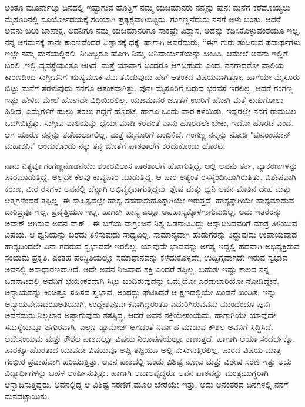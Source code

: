 {ಅಂತೂ ಮೂರ್ನಾಲ್ಕು ದಿನದಲ್ಲಿ ಇಷ್ಟಾಗುವ ಹೊತ್ತಿಗೆ ನಮ್ಮ ಯಜಮಾನರು ನನ್ನನ್ನು ಪುನಃ ಮನೆಗೆ ಕರೆದೊಯ್ಯಲು ಮೈಸೂರಿನಲ್ಲಿ ಸೂರ್ಯೋದಯಕ್ಕೆ ಸರಿಯಾಗಿ  ಪ್ರತ್ಯಕ್ಷವಾಗಿಬಿಟ್ಟರು. ಗಂಗಣ್ಣನೆದುರು ನನಗೆ ಅಳು ಬಂತು. ಆದರೆ ಅವನು ಬಲು ಚಾಣಾಕ್ಷ. ಅವನಿಗೂ ನಮ್ಮ ಯಜಮಾನರಿಗೂ ಸಾಕಷ್ಟೇ ವಿಶ್ವಾಸ, ಅದನ್ನು ಕೆಡಿಸಿ\-ಕೊಳ್ಳುವಂತೆಯೂ ಇಲ್ಲ. ನನ್ನ ಆಗಮನಕ್ಕೆ ತಾನೇ ಕಾರಣವೆಂದರೆ ವಿಶ್ವಾಸಕ್ಕೆ ಧಕ್ಕೆ. ಹಾಗಾಗಿ ಅವರೆದುರು, “ಈಗ ಗುರು ತಂದಿರುವ ಪದಾರ್ಥಗಳು ಇಲ್ಲೇ ನಮ್ಮ ಮನೆಯಲ್ಲಿರಲಿ. ನೀವಿಬ್ಬರೂ ಹೋಗಿ ನಿಮ್ಮ ಅನಿವಾರ್ಯತೆಯನ್ನು ಚಿಂತಿಸಿ, ಆಮೇಲೆ ಅವನು ಇಲ್ಲಿಗೆ ಬರಲಿ. ಇಲ್ಲಿ ವ್ಯವಸ್ಥೆಯಂತೂ ಆಗಿದೆ. ಮತ್ತೆ ಯಾವಾಗ ಬಂದರೂ ಆಗಬಹುದು ಎಂದ. ನನಗಾದರೋ ವಾಲಿಯ ಕಾರಣದಿಂದ ಸುಗ್ರೀವನಿಗೆ ಋಷ್ಯಮೂಕ ಪರ್ವತ\break  ಬಿಡುವುದು ಹೇಗೆ ಆತಂಕದ ವಿಷಯವಾಗಿತ್ತೋ,  ಹಾಗೆಯೇ  ಮೈಸೂರು ಬಿಟ್ಟು ಮನೆಗೆ ತೆರಳುವುದು  ನನಗೂ ಆತಂಕವಾಗಿತ್ತು. ಪುನಃ ಮೈಸೂರಿಗೆ ಬರುವ ಭರವಸೆ ಇರಲಿಲ್ಲ. ಆದರೆ ಗಂಗಣ್ಣ ಇಷ್ಟು ಹೇಳಿದ ಮೇಲೆ ಹೋಗದೇ ವಿಧಿಯಿರಲಿಲ್ಲ. ಯಜಮಾನರ ಜೊತೆಗೆ ಊರಿಗೆ ಹೋಗಿ ಮತ್ತೆ ಕುಡುಗೋಲು ಹಿಡಿದೆ, ಎಮ್ಮೆಗಳಿಗೆ ಹುಲ್ಲು ತರಲು ಗದ್ದೆಗೆ ಹೊರಟೆ. ಹಾಗೂ ಒಂದು ವಾರ ಕಳೆಯಿತು. ಇಷ್ಟರಲ್ಲೇ ನನಗೆ ರಾಮಬಲ ಒದಗಿಬಿಟ್ಟಿತ್ತು. ಸುಗ್ರೀವ ವಾಲಿಯನ್ನು ಧೈರ್ಯಮಾಡಿ ಕರೆದಂತೆ ನಾನು ಹೊರಡಲೇ ಬೇಕು, ಇದೋ ಹೊರಟೆ ಎಂದೆ. ಆಗ ಯಾರೂ ನನ್ನನ್ನು ತಡೆಯಲಾಗಲಿಲ್ಲ. ಮತ್ತೆ ಮೈಸೂರಿಗೆ ಬಂದಿಳಿದೆ. ಗಂಗಣ್ಣ ನನ್ನನ್ನು ನೋಡಿ "ಪುನರಾಯಾನ್ ಮಹಾಕಪಿಃ" ಅಂದುಕೊಂಡು ನಕ್ಕು ತನ್ನ ಜೊತೆಗೆ ಪಾಠಶಾಲೆಗೆ ಕರೆದುಕೊಂಡು ಹೊರಟ. 

ನಾನು ನಿತ್ಯವೂ ಗಂಗಣ್ಣನೊಡನೆಯೇ ಶಂಕರವಿಲಾಸ ಪಾಠಶಾಲೆಗೆ ಹೋಗುತ್ತಿದ್ದೆ. ಅಲ್ಲಿ ಅವನು ತರ್ಕ, ವ್ಯಾಕರಣಗಳನ್ನು ಪಾಠಮಾಡುತ್ತಿದ್ದ. ಅಲ್ಲದೇ ಕೆಲವು \hbox{ಕಾವ್ಯಪಾಠ} ಮಾಡುತ್ತಿದ್ದ. ಆ ಪಾಠ ಅತ್ಯಂತ ರಸಸ್ಯಂದಿಯಾಗಿರುತ್ತಿತ್ತು. ವಿಶೇಷವಾಗಿ ಕರುಣ, ವೀರ ರಸಗಳು ಅವನಲ್ಲಿ ಚೆನ್ನಾಗಿ ಅಭಿವ್ಯಕ್ತವಾಗುತ್ತಿದ್ದವು. ಶ್ಲೇಷ ಮತ್ತು ಧ್ವನಿ ಅವನ ಮಾತಿನ ದೇಹ ಮತ್ತು ಆತ್ಮಗಳೆಂದರೆ ತಪ್ಪಿಲ್ಲ. ಈ ಸಾಹಿತ್ಯದಲ್ಲೇ ಹಾಸ್ಯ  ಸಹ\break ಹಾಸು\enginline{-}ಹೊಕ್ಕಾಗಿಯೇ ಇರುತ್ತದೆ.  ಹಾಸ್ಯಕ್ಕಾಗಿಯೇ ಹಾಸ್ಯಮಾಡುವ ದಾರಿದ್ರ್ಯವೂ ಇಲ್ಲ,  ಪ್ರವೃತ್ತಿಯೂ ಇಲ್ಲ. ಹಾಗಾಗಿ ಹಾಸ್ಯ ಎಲ್ಲೂ ಅಪಹಾಸ್ಯಕ್ಕೊಳಗಾಗುವುದಿಲ್ಲ. ಅದು ಇತರರನ್ನು ಅವಾಕ್ ಆಗಿಸುವ ಅವನ ವಾಕ್ .  ಈ ಬಗೆಯ ವಾಗ್ರಂಜನೆ  ನಿತ್ಯ ಒಡನಾಟವಿದ್ದು ಆಸ್ವಾದಿಸಿದವರಿಗೆ ಮಾತ್ರ  ತಿಳಿಯುವ ವಿಷಯ. ಆ ಧ್ವನಿಯನ್ನು  ಬರೆದು ತಿಳಿಸುವುದು  ಸಾಧ್ಯವಿಲ್ಲ. ಸಾಮಾನ್ಯವಾಗಿ ಹುಡುಗರನ್ನು ತಿದ್ದುವುದು ಉಪಾಯವಾದ ಹಾಸ್ಯದಿಂದಲೇ ವಿನಾ ಗದರುವ ಸ್ವಭಾವವೇ ಇರಲಿಲ್ಲ. ಯಾವುದೇ ಭಾವವನ್ನು ಅಗತ್ಯ ಇದ್ದಲ್ಲಿ ಹದವಾಗಿ ಅಭಿವ್ಯಕ್ತಿಸುವ ಸಂಯಮ ಪ್ರಕೃತಿ. ಎಂತಹ ಪರಿಸ್ಥಿತಿಯಲ್ಲೂ ಸಮಾಧಾನವನ್ನು ಕಳೆದು\-ಕೊಳ್ಳದೇ, ಉದ್ವಿಗ್ನವಾಗದೇ ಇರುವ ಸ್ವಭಾವ ಅವನಲ್ಲಿ ಅಸಾಧಾರಣ\-ವಾಗಿದೆ. ಅದೇ ಅವನ ನಿಜವಾದ ಶಕ್ತಿ ಎಂದರೆ ತಪ್ಪಿಲ್ಲ. ಬಹುಶಃ ಇಷ್ಟು ಕಾಲದ ನನ್ನ ಒಡನಾಟದಲ್ಲಿ ಅವನಿಗೆ ಭಯಂಕರವಾಗಿ ಸಿಟ್ಟು ಬಂದಿರುವುದನ್ನು   ಒಮ್ಮೆಯೋ ಎರಡು\break ಬಾರಿಯೋ ನೋಡಿದ್ದೇನೆ. ಅನ್ಯಾಯವನ್ನು ಕಿಂಚಿತ್ತೂ ಸಹಿಸದ ಸ್ವಭಾವ, ಅಂಥದ್ದು  ಘಟಿಸಿದರೆ  ಆ ಕ್ಷಣದಲ್ಲಿಯೇ ಖಂಡನೆ ಖಂಡಿತ. ಇನ್ನು  ಅನ್ಯಾಯವೇನಾದರೂ\break ಅತಿಯಾಗಿ, ಉದ್ದೇಶಪೂರ್ವಕವಾಗಿದ್ದರಂತೂ ಎದುರಿಗಿರುವವನು ಮುಂದೆಂದೂ ಪುನಃ ಅವನೆದುರು ನಿಲ್ಲಲಾರ \enginline{-} ಅಷ್ಟಾಗುವುದು ಶತಸ್ಸಿದ್ಧ. ಆದರೆ ಅವನ ಶಕ್ತಿಯೇ\break ಸಂಯಮ. ಹಾಗಾಗಿಯೇ ಯಾವುದೇ ಸಮಸ್ಯೆಯನ್ನೂ ಹಗುರವಾಗಿ, ಎಲ್ಲೂ \break ಡ್ಯಾಮೇಜ್ ಆಗದಂತೆ ನಿರ್ವಾಹ ಮಾಡುವ ಕೌಶಲ ಅವನಿಗೆ ಸಿದ್ಧಿಸಿದೆ. ಅದೇ\break ಸಂಯಮ ಮತ್ತು ಕೌಶಲ ಪಾಠದಲ್ಲೂ ವಿಷಯ ನಿರೂಪಣೆಯಲ್ಲೂ ಕಾಣುತ್ತದೆ. ಹಾಗಾಗಿ ಆಯಾ \hbox{ಸಂದರ್ಭಕ್ಕೂ}, ಪಾಠಕ್ಕೂ ಹೊರತಾದ ಯಾವದೇ ವಿಷಯವೂ ಅಪ್ಪಿ ತಪ್ಪಿಯೂ ಅಲ್ಲಿ ನುಸುಳುತ್ತಿರ\-ಲಿಲ್ಲ. ಪಾಠದ ವಿಷಯ ಮಾತ್ರ ಗಂಭೀರ ಪ್ರವಾಹವಾಗಿ ಹರಿಯುತ್ತಿತ್ತು. ಅವನ ಪಾಠದಲ್ಲಿ  ಒಂದು ವಿಶಿಷ್ಟ ನೋಟ ಮತ್ತು ವಿಶೇಷ  ಸರಣಿ ಇತ್ತು \enginline{-} ಅದು ವಿದ್ಯಾರ್ಥಿಗಳನ್ನು  ಬಹಳ ಆಕರ್ಷಿಸುತ್ತಿತ್ತು. ಹಾಗಾಗಿ ಆಬಾಲ\enginline{-}ವೃದ್ಧರೂ ಅವನ ಪಾಠವನ್ನು ಮಂತ್ರಮುಗ್ಧರಾಗಿ ಆಸ್ವಾದಿಸುತ್ತಿದ್ದರು. ಅವನಲ್ಲಿದ್ದ  ಆ ವಿಶಿಷ್ಟ ಸರಣಿಗೆ  ಮೂಲ ಬೇರೆಯೇ ಇತ್ತು.  ಅದು ಅನಂತರದ ದಿನಗಳಲ್ಲಿ ನನಗೆ ಮನದಟ್ಟಾಯಿತು. 

}
